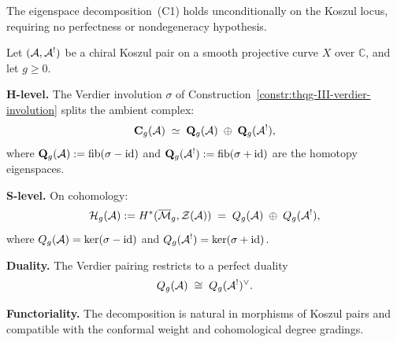 The eigenspace decomposition~(C1) holds unconditionally on the
Koszul locus, requiring no perfectness or nondegeneracy
hypothesis.

\begin{theorem}
\label{thm:thqg-III-eigenspace-decomposition}
Let $(\mathcal{A}, \mathcal{A}^!)$ be a chiral Koszul pair on a smooth projective
curve $X$ over $\mathbb{C}$, and let $g \ge 0$.

\smallskip\noindent
\textbf{H-level.}\;
The Verdier involution $\sigma$ of
Construction~\textup{\ref{constr:thqg-III-verdier-involution}}
splits the ambient complex:
\begin{equation}%
\mathbf{C}_g(\cA)
\;\simeq\;
\mathbf{Q}_g(\cA) \;\oplus\; \mathbf{Q}_g(\cA^!),
\end{equation}
where
$\mathbf{Q}_g(\mathcal{A}) := \operatorname{fib}(\sigma - \mathrm{id})$ and
$\mathbf{Q}_g(\mathcal{A}^!) := \operatorname{fib}(\sigma + \mathrm{id})$
are the homotopy eigenspaces.

\smallskip\noindent
\textbf{S-level.}\;
On cohomology:
\begin{equation}%
\mathcal{H}_g(\cA)
:= H^*(\overline{\mathcal{M}}_g, \mathcal{Z}(\cA))
\;=\;
Q_g(\cA) \;\oplus\; Q_g(\cA^!),
\end{equation}
where $Q_g(\mathcal{A}) = \ker(\sigma - \mathrm{id})$ and
$Q_g(\mathcal{A}^!) = \ker(\sigma + \mathrm{id})$.

\smallskip\noindent
\textbf{Duality.}\;
The Verdier pairing restricts to a perfect duality
\begin{equation}%
Q_g(\cA) \;\cong\; Q_g(\cA^!)^{\vee}.
\end{equation}

\smallskip\noindent
\textbf{Functoriality.}\;
The decomposition is natural in morphisms of Koszul pairs and
compatible with the conformal weight and cohomological degree
gradings.
\end{theorem}

